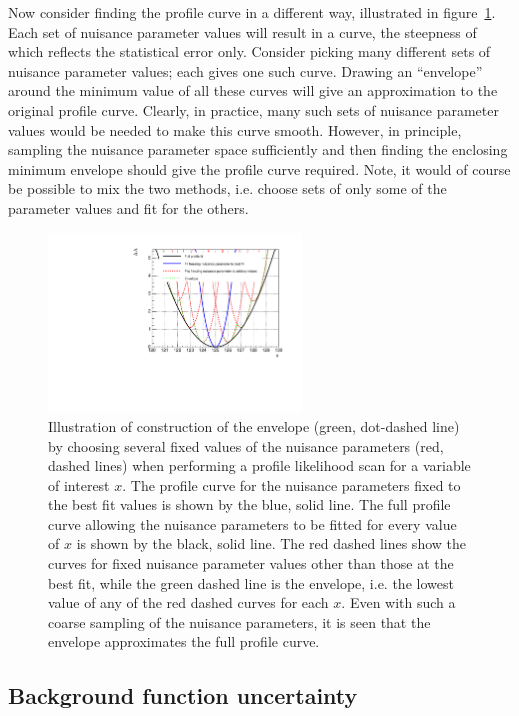 Now consider finding the profile curve in a different way, illustrated
in figure~\ref{fig:concept:cartoon}.
Each set of nuisance
parameter values will result in a curve, the steepness of which reflects 
the statistical error only. Consider picking many different sets of nuisance
parameter values; each gives one such curve. Drawing an ``envelope'' around the
minimum \nll value of all these curves will give an approximation to the
original profile curve. Clearly, in practice, many such sets of nuisance
parameter values would be needed to make this curve smooth. However, in
principle, sampling the nuisance parameter space sufficiently
and then finding the enclosing
minimum envelope should give the profile curve required.
Note, it would of course be possible to mix the two methods, i.e.
choose sets of only some of the parameter values and fit for the others.
%
\begin{figure}[tbp]
\centering
\includegraphics[width=0.6\textwidth]{concept/envelope_cartoon.pdf}
\caption{Illustration of construction of the envelope (green, dot-dashed line)
by choosing several fixed values of the nuisance parameters (red, dashed lines)
when performing a profile likelihood scan for a variable of interest $x$.
The \nll profile curve for the nuisance parameters fixed to the best fit
values is shown by the blue, solid line. The full profile curve allowing the
nuisance parameters to be fitted for every value of $x$ is shown by the 
black, solid line. The red dashed lines show the \nll curves for fixed 
nuisance parameter values other than those at the best fit, while the green 
dashed line is the envelope, i.e. the lowest value of any of the red dashed 
curves for each $x$. Even with such a coarse sampling of the nuisance 
parameters, it is seen that the envelope approximates the full profile curve.}
\label{fig:concept:cartoon}
\end{figure}

\subsection{Background function uncertainty}
\label{sec:concept:functions}

